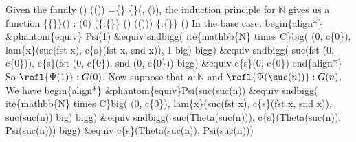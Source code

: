 Given the family
  () 
  (()) =\coqdocvar{\_}\{\} \{\}(, ()),
the induction principle for $\mathbb{N}$ gives us a function
  \{\{\}\}() :
  (0)  (\{:\{\}\} ()  (())) 
  \{:\{\}\} ()
In the base case,
begin\{align*\}
  \&phantom\{equiv\} Psi(1)
  \&equiv
  sndbigg(
    ite\{mathbb\{N\} times C\}big(
    (0, c\{0\}),
    lam\{x\}(suc(fst x), c\{s\}(fst x, snd x)),
    1
    big)
  bigg)
  \&equiv
  sndbigg(
    suc(fst (0, c\{0\})), c\{s\}(fst (0, c\{0\}), snd (0, c\{0\}))
  bigg)
  \&equiv
  c\{s\}(0, c\{0\})
end\{align*\}
So $\refl{\Psi(1)} : G(0)$.  Now suppose that $n : \mathbb{N}$ and
$\refl{\Psi(\suc(n))} : G(n)$.  We have
begin\{align*\}
  \&phantom\{equiv\}Psi(suc(suc(n))
  \&equiv
  sndbigg(
    ite\{mathbb\{N\} times C\}big(
    (0, c\{0\}),
    lam\{x\}(suc(fst x), c\{s\}(fst x, snd x)),
    suc(suc(n))
    big)
  bigg)
  \&equiv
  sndbigg(
    suc(Theta(suc(n))), c\{s\}(Theta(suc(n)), Psi(suc(n)))
  bigg)
  \&equiv
  c\{s\}(Theta(suc(n)), Psi(suc(n)))
